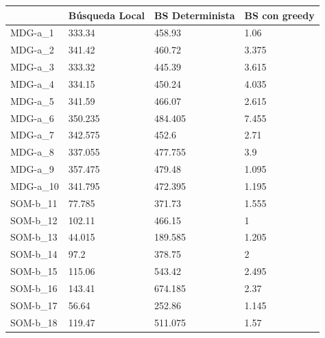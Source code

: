 \documentclass[11pt,a4paper]{article}
\begin{document}
	\begin{table}[H]
		\begin{tabular}{l|l|l|l|}
			\cline{2-4}
			& Búsqueda Local & BS Determinista & BS con greedy \\ \hline
			\multicolumn{1}{|l|}{MDG-a\_1}  & 333.34         & 458.93          & 1.06          \\ \hline
			\multicolumn{1}{|l|}{MDG-a\_2}  & 341.42         & 460.72          & 3.375         \\ \hline
			\multicolumn{1}{|l|}{MDG-a\_3}  & 333.32         & 445.39          & 3.615         \\ \hline
			\multicolumn{1}{|l|}{MDG-a\_4}  & 334.15         & 450.24          & 4.035         \\ \hline
			\multicolumn{1}{|l|}{MDG-a\_5}  & 341.59         & 466.07          & 2.615         \\ \hline
			\multicolumn{1}{|l|}{MDG-a\_6}  & 350.235        & 484.405         & 7.455         \\ \hline
			\multicolumn{1}{|l|}{MDG-a\_7}  & 342.575        & 452.6           & 2.71          \\ \hline
			\multicolumn{1}{|l|}{MDG-a\_8}  & 337.055        & 477.755         & 3.9           \\ \hline
			\multicolumn{1}{|l|}{MDG-a\_9}  & 357.475        & 479.48          & 1.095         \\ \hline
			\multicolumn{1}{|l|}{MDG-a\_10} & 341.795        & 472.395         & 1.195         \\ \hline
			\multicolumn{1}{|l|}{SOM-b\_11} & 77.785         & 371.73          & 1.555         \\ \hline
			\multicolumn{1}{|l|}{SOM-b\_12} & 102.11         & 466.15          & 1             \\ \hline
			\multicolumn{1}{|l|}{SOM-b\_13} & 44.015         & 189.585         & 1.205         \\ \hline
			\multicolumn{1}{|l|}{SOM-b\_14} & 97.2           & 378.75          & 2             \\ \hline
			\multicolumn{1}{|l|}{SOM-b\_15} & 115.06         & 543.42          & 2.495         \\ \hline
			\multicolumn{1}{|l|}{SOM-b\_16} & 143.41         & 674.185         & 2.37          \\ \hline
			\multicolumn{1}{|l|}{SOM-b\_17} & 56.64          & 252.86          & 1.145         \\ \hline
			\multicolumn{1}{|l|}{SOM-b\_18} & 119.47         & 511.075         & 1.57          \\ \hline

\end{tabular}
\end{table}
\end{document}
